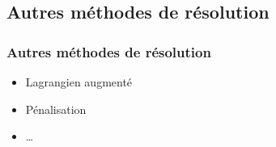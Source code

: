 \documentclass[11pt,envcountsect,aspectratio=169]{beamer} %
\begin{document}
\subsection{Autres méthodes de résolution}

\begin{frame}
    \frametitle{Autres méthodes de résolution}

    \begin{itemize}
        \item Lagrangien augmenté
        \item Pénalisation
        \item \dots
    \end{itemize}

\end{frame}
\end{document}
